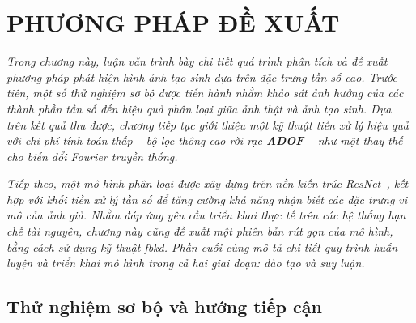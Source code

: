 \chapter{PHƯƠNG PHÁP ĐỀ XUẤT}
\label{Chapter3}
%
\textit{
Trong chương này, luận văn trình bày chi tiết quá trình phân tích và đề xuất phương pháp phát hiện hình ảnh tạo sinh dựa trên đặc trưng tần số cao. Trước tiên, một số thử nghiệm sơ bộ được tiến hành nhằm khảo sát ảnh hưởng của các thành phần tần số đến hiệu quả phân loại giữa ảnh thật và ảnh tạo sinh. Dựa trên kết quả thu được, chương tiếp tục giới thiệu một kỹ thuật tiền xử lý hiệu quả với chi phí tính toán thấp – bộ lọc thông cao rời rạc \textbf{ADOF} – như một thay thế cho biến đổi Fourier truyền thống.}

\textit{Tiếp theo, một mô hình phân loại được xây dựng trên nền kiến trúc ResNet~\cite{He2015DeepRL}, kết hợp với khối tiền xử lý tần số để tăng cường khả năng nhận biết các đặc trưng vi mô của ảnh giả. Nhằm đáp ứng yêu cầu triển khai thực tế trên các hệ thống hạn chế tài nguyên, chương này cũng đề xuất một phiên bản rút gọn của mô hình, bằng cách sử dụng kỹ thuật \gls{fbkd}. Phần cuối cùng mô tả chi tiết quy trình huấn luyện và triển khai mô hình trong cả hai giai đoạn: đào tạo và suy luận.}\\
%
\section{Thử nghiệm sơ bộ và hướng tiếp cận}
%

